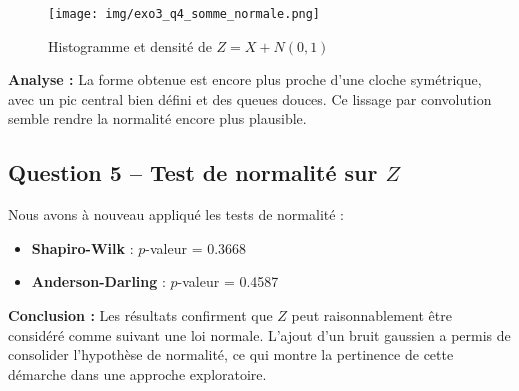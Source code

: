 \documentclass[a4paper,11pt]{article}
\begin{document}
\begin{figure}[H]
    \centering
    \texttt{[image: img/exo3\_q4\_somme\_normale.png]}
    \caption{Histogramme et densité de $Z = X + N(0,1)$}
\end{figure}

\textbf{Analyse :} La forme obtenue est encore plus proche d’une cloche symétrique, avec un pic central bien défini et des queues douces. Ce lissage par convolution semble rendre la normalité encore plus plausible.

\subsection*{Question 5 – Test de normalité sur $Z$}
Nous avons à nouveau appliqué les tests de normalité :

\begin{itemize}
    \item \textbf{Shapiro-Wilk} : $p$-valeur = 0.3668
    \item \textbf{Anderson-Darling} : $p$-valeur = 0.4587
\end{itemize}

\textbf{Conclusion :} Les résultats confirment que $Z$ peut raisonnablement être considéré comme suivant une loi normale. L’ajout d’un bruit gaussien a permis de consolider l’hypothèse de normalité, ce qui montre la pertinence de cette démarche dans une approche exploratoire.
\end{document}
